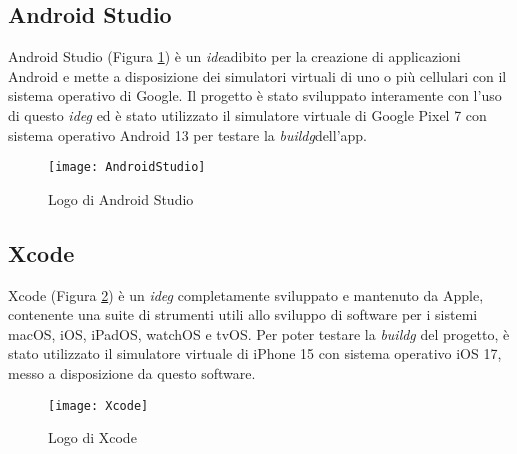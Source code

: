 \subsection{Android Studio}
Android Studio (Figura \ref{fig:android}) è un \emph{\gls{ide}}\glsfirstoccur adibito per la creazione di applicazioni Android e mette a disposizione dei simulatori virtuali di uno o più cellulari con il sistema operativo di Google.\newline
Il progetto è stato sviluppato interamente con l'uso di questo \emph{\gls{ideg}} ed è stato utilizzato il simulatore virtuale di Google Pixel 7 con sistema operativo Android 13 per testare la \emph{\gls{buildg}}\glsfirstoccur dell'app.\newline
\begin{figure}[!h] 
    \centering 
    \texttt{[image: AndroidStudio]} 
    \caption{Logo di Android Studio}\label{fig:android}
\end{figure}

\subsection{Xcode}
Xcode (Figura \ref{fig:apple}) è un \emph{\gls{ideg}} completamente sviluppato e mantenuto da Apple, contenente una suite di strumenti utili allo sviluppo di software per i sistemi macOS, iOS, iPadOS, watchOS e tvOS.\newline
Per poter testare la \emph{\gls{buildg}} del progetto, è stato utilizzato il simulatore virtuale di iPhone 15 con sistema operativo iOS 17, messo a disposizione da questo software.\newline
\begin{figure}[!h] 
    \centering 
    \texttt{[image: Xcode]} 
    \caption{Logo di Xcode}\label{fig:apple}
\end{figure}

